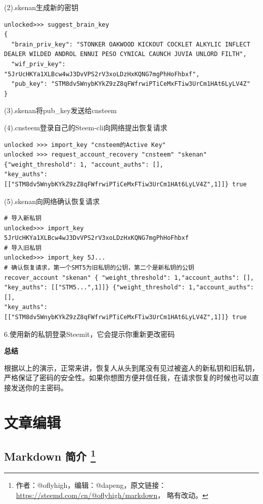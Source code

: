 \documentclass[]{ctexbook}
\begin{document}
(2).skenan生成新的密钥

\begin{verbatim}
unlocked>>> suggest_brain_key
{
  "brain_priv_key": "STONKER OAKWOOD KICKOUT COCKLET ALKYLIC INFLECT DEALER WILDED ANDROL ENNUI PESO CYNICAL CAUNCH JUVIA UNLORD FILTH",
  "wif_priv_key": "5JrUcHKYa1XLBcw4wJ3DvVPS2rV3xoLDzHxKQNG7mgPhHoFhbxf",
  "pub_key": "STM8dv5WnybKYkZ9zZ8qFWfrwiPTiCeMxFTiw3UrCm1HAt6LyLV4Z"
}
\end{verbatim}

(3).skenan将pub\_key发送给cnsteem

(4).cnsteem登录自己的Steem-cli向网络提出恢复请求

\begin{verbatim}
unlocked >>> import_key "cnsteem的Active Key"
unlocked >>> request_account_recovery "cnsteem" "skenan" 
{"weight_threshold": 1, "account_auths": [], 
"key_auths":[["STM8dv5WnybKYkZ9zZ8qFWfrwiPTiCeMxFTiw3UrCm1HAt6LyLV4Z",1]]} true
\end{verbatim}

(5).skenan向网络确认恢复请求

\begin{verbatim}
# 导入新私钥
unlocked>>> import_key 5JrUcHKYa1XLBcw4wJ3DvVPS2rV3xoLDzHxKQNG7mgPhHoFhbxf
# 导入旧私钥
unlocked>>> import_key 5J...
# 确认恢复请求，第一个SMT5为旧私钥的公钥，第二个是新私钥的公钥
recover_account "skenan" { "weight_threshold": 1,"account_auths": [],
"key_auths": [["STM5...",1]]} {"weight_threshold": 1,"account_auths": [],
"key_auths": [["STM8dv5WnybKYkZ9zZ8qFWfrwiPTiCeMxFTiw3UrCm1HAt6LyLV4Z",1]]} true
\end{verbatim}

6.使用新的私钥登录Steemit，它会提示你重新更改密码

\textbf{总结}

根据以上的演示，正常来讲，恢复人从头到尾没有见过被盗人的新私钥和旧私钥，严格保证了密码的安全性。如果你想图方便并信任我，在请求恢复的时候也可以直接发送你的主密码。

\hypertarget{wzbjp}{%
\chapter{文章编辑}\label{wzbjp}}

\hypertarget{markdown_yf}{%
\section[Markdown 简介 ]{\texorpdfstring{Markdown 简介 \footnote{作者：@oflyhigh，编辑：@dapeng，原文链接：\url{https://steemd.com/cn/@oflyhigh/markdown}， 略有改动。}}{Markdown 简介 }}\label{markdown_yf}}
\end{document}
